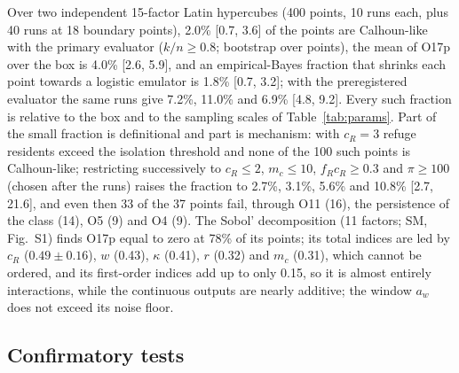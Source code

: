 Over two independent 15-factor Latin hypercubes (400 points, 10 runs each, plus 40 runs at 18 boundary points),
2.0\% [0.7, 3.6] of the points are Calhoun-like with the primary evaluator ($k/n\ge0.8$; bootstrap over points),
the mean of O17p over the box is 4.0\% [2.6, 5.9], and an empirical-Bayes fraction that shrinks each point towards
a logistic emulator is 1.8\% [0.7, 3.2]; with the preregistered evaluator the same runs give 7.2\%, 11.0\% and 6.9\%
[4.8, 9.2]. Every such fraction is relative to the box and to the sampling scales of Table~\ref{tab:params}. Part of
the small fraction is definitional and part is mechanism: with $c_R=3$ refuge residents exceed the isolation
threshold and none of the 100 such points is Calhoun-like; restricting successively to $c_R\le2$, $m_c\le10$,
$f_Rc_R\ge0.3$ and $\pi\ge100$ (chosen after the runs) raises the fraction to 2.7\%, 3.1\%, 5.6\% and 10.8\%
[2.7, 21.6], and even then 33 of the 37 points fail, through O11 (16), the persistence of the class (14), O5 (9)
and O4 (9). The Sobol' decomposition (11 factors; SM, Fig.~S1) finds O17p equal to zero at 78\% of its points; its
total indices are led by $c_R$ ($0.49\pm0.16$), $w$ (0.43), $\kappa$ (0.41), $r$ (0.32) and $m_c$ (0.31), which
cannot be ordered, and its first-order indices add up to only 0.15, so it is almost entirely interactions, while
the continuous outputs are nearly additive; the window $a_w$ does not exceed its noise floor.

\subsection{Confirmatory tests}
\label{sec:res-Q}

